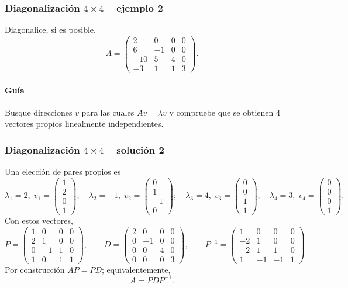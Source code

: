 \subsubsection*{Diagonalización $4\times 4$ -- ejemplo 2}

Diagonalice, si es posible,
\[
A=\begin{pmatrix}2 & 0 & 0 & 0\\6 & -1 & 0 & 0\\-10 & 5 & 4 & 0\\-3 & 1 & 1 & 3\end{pmatrix}.
\]

\paragraph{Guía}
Busque direcciones $v$ para las cuales $Av=\lambda v$ y compruebe que se obtienen $4$ vectores propios linealmente independientes.



\subsubsection*{Diagonalización $4\times 4$ -- solución 2}
\scriptsize
Una elección de pares propios es
\[
\lambda_1=2,\;v_1=\begin{pmatrix}1\\2\\0\\1\end{pmatrix};\quad \lambda_2=-1,\;v_2=\begin{pmatrix}0\\1\\-1\\0\end{pmatrix};\quad \lambda_3=4,\;v_3=\begin{pmatrix}0\\0\\1\\1\end{pmatrix};\quad \lambda_4=3,\;v_4=\begin{pmatrix}0\\0\\0\\1\end{pmatrix}.
\]
Con estos vectores,
\[
P=\begin{pmatrix}1 & 0 & 0 & 0\\2 & 1 & 0 & 0\\0 & -1 & 1 & 0\\1 & 0 & 1 & 1\end{pmatrix},\qquad D=\begin{pmatrix}2 & 0 & 0 & 0\\0 & -1 & 0 & 0\\0 & 0 & 4 & 0\\0 & 0 & 0 & 3\end{pmatrix},\qquad P^{-1}=\begin{pmatrix}1 & 0 & 0 & 0\\-2 & 1 & 0 & 0\\-2 & 1 & 1 & 0\\1 & -1 & -1 & 1\end{pmatrix}.
\]
Por construcción $AP=PD$; equivalentemente,
\[
\boxed{A=PDP^{-1}}.
\]



